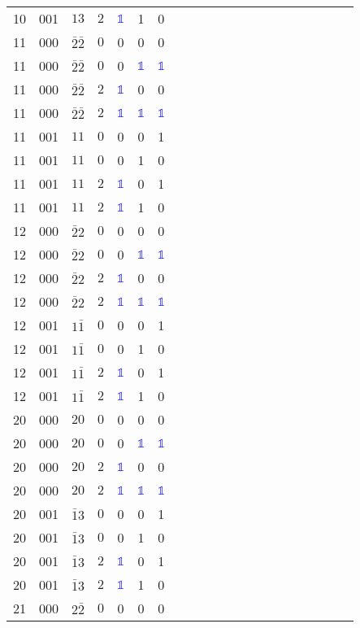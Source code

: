 \begin{longtable*}{c| cccccccccccccccccccc }
10& 001& $13$& $2$& \textcolor{blue}{$\mathds{1}$}& 1& 0\\
11& 000& $\bar{2}\bar{2}$& $0$& 0& 0& 0\\
11& 000& $\bar{2}\bar{2}$& $0$& 0& \textcolor{blue}{$\mathds{1}$}& \textcolor{blue}{$\mathds{1}$}\\
11& 000& $\bar{2}\bar{2}$& $2$& \textcolor{blue}{$\mathds{1}$}& 0& 0\\
11& 000& $\bar{2}\bar{2}$& $2$& \textcolor{blue}{$\mathds{1}$}& \textcolor{blue}{$\mathds{1}$}& \textcolor{blue}{$\mathds{1}$}\\
11& 001& $11$& $0$& 0& 0& 1\\
11& 001& $11$& $0$& 0& 1& 0\\
11& 001& $11$& $2$& \textcolor{blue}{$\mathds{1}$}& 0& 1\\
11& 001& $11$& $2$& \textcolor{blue}{$\mathds{1}$}& 1& 0\\
12& 000& $\bar{2}2$& $0$& 0& 0& 0\\
12& 000& $\bar{2}2$& $0$& 0& \textcolor{blue}{$\mathds{1}$}& \textcolor{blue}{$\mathds{1}$}\\
12& 000& $\bar{2}2$& $2$& \textcolor{blue}{$\mathds{1}$}& 0& 0\\
12& 000& $\bar{2}2$& $2$& \textcolor{blue}{$\mathds{1}$}& \textcolor{blue}{$\mathds{1}$}& \textcolor{blue}{$\mathds{1}$}\\
12& 001& $1\bar{1}$& $0$& 0& 0& 1\\
12& 001& $1\bar{1}$& $0$& 0& 1& 0\\
12& 001& $1\bar{1}$& $2$& \textcolor{blue}{$\mathds{1}$}& 0& 1\\
12& 001& $1\bar{1}$& $2$& \textcolor{blue}{$\mathds{1}$}& 1& 0\\
20& 000& $20$& $0$& 0& 0& 0\\
20& 000& $20$& $0$& 0& \textcolor{blue}{$\mathds{1}$}& \textcolor{blue}{$\mathds{1}$}\\
20& 000& $20$& $2$& \textcolor{blue}{$\mathds{1}$}& 0& 0\\
20& 000& $20$& $2$& \textcolor{blue}{$\mathds{1}$}& \textcolor{blue}{$\mathds{1}$}& \textcolor{blue}{$\mathds{1}$}\\
20& 001& $\bar{1}3$& $0$& 0& 0& 1\\
20& 001& $\bar{1}3$& $0$& 0& 1& 0\\
20& 001& $\bar{1}3$& $2$& \textcolor{blue}{$\mathds{1}$}& 0& 1\\
20& 001& $\bar{1}3$& $2$& \textcolor{blue}{$\mathds{1}$}& 1& 0\\
21& 000& $2\bar{2}$& $0$& 0& 0& 0\\

\end{longtable*}
